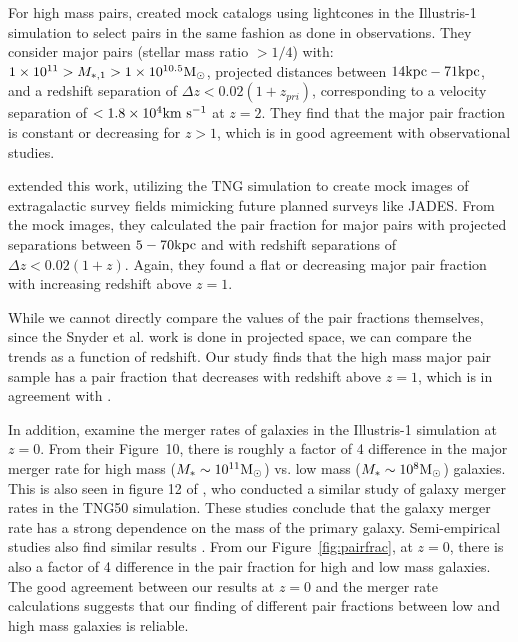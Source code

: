 \documentclass[twocolumn]{aastex631}
\begin{document}
        For high mass pairs, \citet{snyder2017} created mock catalogs using lightcones in the Illustris-1 simulation to select pairs in the same fashion as done in observations. 
        They consider major pairs (stellar mass ratio $>1/4$) with: $1\times 10^{11}>M_{*,1} >1\times 10^{10.5}\mathrm{M}_\odot$, projected distances between $14\mathrm{kpc}-71\mathrm{kpc}$, and a redshift separation of $\Delta z<0.02(1+z_{pri})$, corresponding to a velocity separation of $<1.8\times10^4\mathrm{km}~\mathrm{s}^{-1}$ at $z=2$. 
        They find that the major pair fraction is constant or decreasing for $z>1$, which is in good agreement with observational studies.
        
        \citet{snyder2023} extended this work, utilizing the TNG simulation to create mock images of extragalactic survey fields mimicking future planned surveys like JADES.
        From the mock images, they calculated the pair fraction for major pairs with projected separations between $5-70 \mathrm{kpc}$ and with redshift separations of $\Delta z< 0.02(1+z)$. 
        Again, they found a flat or decreasing major pair fraction with increasing redshift above $z=1$. 
        
        While we cannot directly compare the values of the pair fractions themselves, since the Snyder et al. work is done in projected space, we can compare the trends as a function of redshift. 
        Our study finds that the high mass major pair sample has a pair fraction that decreases with redshift above $z=1$, which is in agreement with \cite{snyder2023}.

        In addition, \cite{rg15} examine the merger rates of galaxies in the Illustris-1 simulation at $z=0$. 
        From their Figure~10, there is roughly a factor of 4 difference in the major merger rate for high mass ($M_* \sim 10^{11} \mathrm{M}_\odot$) vs. low mass ($M_* \sim 10^8 \mathrm{M}_\odot$) galaxies. 
        This is also seen in figure 12 of \cite{Guzman-Ortega2023}, who conducted a similar study of galaxy merger rates in the TNG50 simulation. 
        These studies conclude that the galaxy merger rate has a strong dependence on the mass of the primary galaxy. 
        Semi-empirical studies also find similar results \citep{Stewart2009, Hopkins2010}. 
        From our Figure~\ref{fig:pairfrac}, at $z=0$, there is also a factor of 4 difference in the pair fraction for high and low mass galaxies. 
        The good agreement between our results at $z=0$ and the merger rate calculations suggests that our finding of different pair fractions between low and high mass galaxies is reliable.  
  
\end{document}
